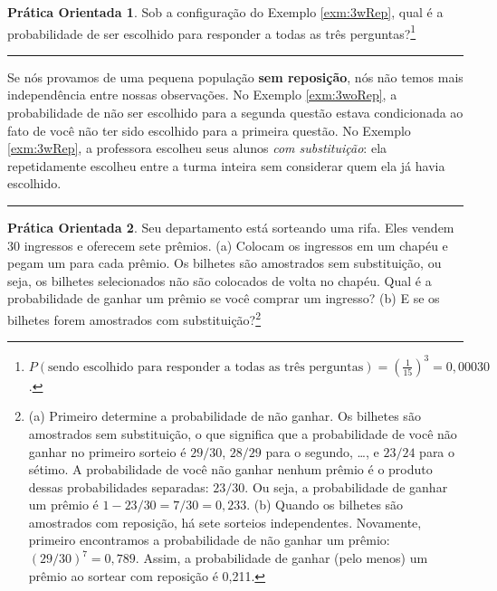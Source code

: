 \documentclass[
]{book}
\theoremstyle{definition}
\theoremstyle{definition}
\theoremstyle{definition}
\newtheorem{exercise}{Prática Orientada}[chapter]
\theoremstyle{definition}
\theoremstyle{remark}
\begin{document}
\begin{exercise}
\protect\hypertarget{exr:unnamed-chunk-70}{}{\label{exr:unnamed-chunk-70} }Sob a configuração do Exemplo \ref{exm:3wRep}, qual é a probabilidade de ser escolhido para responder a todas as três perguntas?\footnote{\(P(\text{sendo escolhido para responder a todas as três perguntas}) = \left(\frac{1}{15}\right)^3 = 0,00030\).}
\end{exercise}

\begin{center}\rule{0.5\linewidth}{0.5pt}\end{center}

Se nós provamos de uma pequena população \textbf{sem reposição}, nós não temos mais independência entre nossas observações. No Exemplo \ref{exm:3woRep}, a probabilidade de não ser escolhido para a segunda questão estava condicionada ao fato de você não ter sido escolhido para a primeira questão. No Exemplo \ref{exm:3wRep}, a professora escolheu seus alunos \emph{com substituição}: ela repetidamente escolheu entre a turma inteira sem considerar quem ela já havia escolhido.

\begin{center}\rule{0.5\linewidth}{0.5pt}\end{center}

\begin{exercise}
\protect\hypertarget{exr:raffleOf30TicketsWWOReplacement}{}{\label{exr:raffleOf30TicketsWWOReplacement} }Seu departamento está sorteando uma rifa. Eles vendem 30 ingressos e oferecem sete prêmios.
(a) Colocam os ingressos em um chapéu e pegam um para cada prêmio. Os bilhetes são amostrados sem substituição, ou seja, os bilhetes selecionados não são colocados de volta no chapéu. Qual é a probabilidade de ganhar um prêmio se você comprar um ingresso?
(b) E se os bilhetes forem amostrados com substituição?\footnote{(a) Primeiro determine a probabilidade de não ganhar. Os bilhetes são amostrados sem substituição, o que significa que a probabilidade de você não ganhar no primeiro sorteio é \(29/30\), \(28/29\) para o segundo, \ldots, e \(23/24\) para o sétimo. A probabilidade de você não ganhar nenhum prêmio é o produto dessas probabilidades separadas: \(23/30\). Ou seja, a probabilidade de ganhar um prêmio é \(1 - 23/30 = 7/30 = 0,233\). (b) Quando os bilhetes são amostrados com reposição, há sete sorteios independentes. Novamente, primeiro encontramos a probabilidade de não ganhar um prêmio: \((29/30)^7 = 0,789\). Assim, a probabilidade de ganhar (pelo menos) um prêmio ao sortear com reposição é 0,211.}
\end{exercise}
\end{document}
